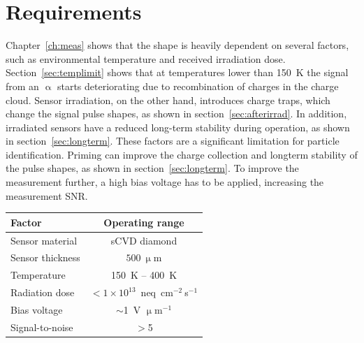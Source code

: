 \section{Requirements}
Chapter~\ref{ch:meas} shows that the shape is heavily dependent on several factors, such as environmental temperature and received irradiation dose. Section~\ref{sec:templimit} shows that at temperatures lower than 150~K the signal from an $\upalpha$ starts deteriorating due to recombination of charges in the charge cloud. Sensor irradiation, on the other hand, introduces charge traps, which change the signal pulse shapes, as shown in section~\ref{sec:afterirrad}. In addition, irradiated sensors have a reduced long-term stability during operation, as shown in section~\ref{sec:longterm}. These factors are a significant limitation for particle identification. Priming can improve the charge collection and longterm stability of the pulse shapes, as shown in section~\ref{sec:longterm}. To improve the measurement further, a high bias voltage has to be applied, increasing the measurement SNR.
\begin{center}
\begin{tabular}{l*{1}{c}}
Factor              & Operating range \\
\hline
Sensor material & sCVD diamond \\
Sensor thickness & $500~\upmu$m \\
Temperature & 150~K -- 400~K \\
Radiation dose & $<1\times10^{13}$~neq~cm$^{-2}~$s$^{-1}$ \\
Bias voltage & $\sim$1~V $\upmu$m$^{-1}$ \\
Signal-to-noise & $>$5 \\
\hline
\end{tabular}
\label{tab:limits}
\end{center}



